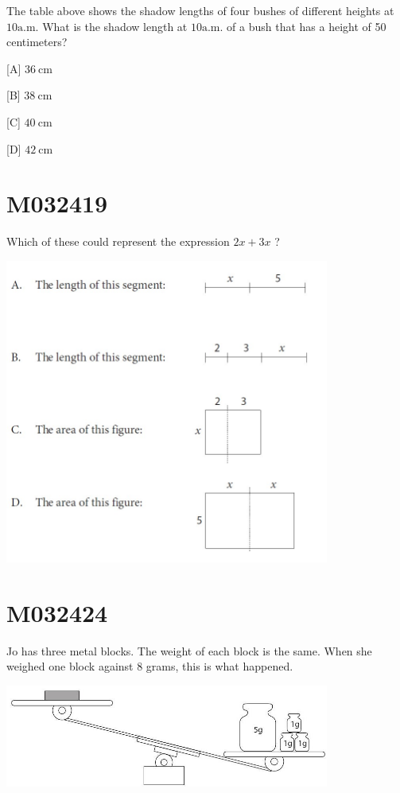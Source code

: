 \documentclass[12pt]{article}
\begin{document}
The table above shows the shadow lengths of four bushes of different heights at $10 \mathrm{a} . \mathrm{m}$. What is the shadow length at $10 \mathrm{a} . \mathrm{m}$. of a bush that has a height of 50 centimeters?

[A] $36 \mathrm{~cm}$

[B] $38 \mathrm{~cm}$

[C] $40 \mathrm{~cm}$

[D] $42 \mathrm{~cm}$

\newpage
\section*{M032419}

Which of these could represent the expression $2 x+3 x$ ?

\includegraphics[max width=0.8\textwidth]{2024_02_20_828ebc9d68bcc1fbb223g-24}

\newpage
\section*{M032424}

Jo has three metal blocks. The weight of each block is the same. When she weighed one block against 8 grams, this is what happened.

\includegraphics[max width=0.8\textwidth]{2024_02_20_828ebc9d68bcc1fbb223g-25}
\end{document}
